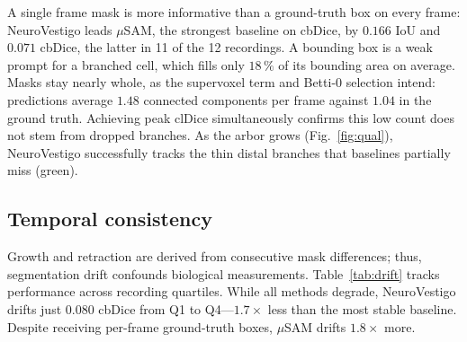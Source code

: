 \documentclass{article}
\begin{document}
A single frame mask is more informative than a ground-truth box on every frame: NeuroVestigo leads $\mu$SAM, the strongest baseline on cbDice, by $0.166$ IoU and $0.071$ cbDice, the latter in 11 of the 12 recordings. A bounding box is a weak prompt for a branched cell, which fills only $18\,\%$ of its bounding area on average. Masks stay nearly whole, as the supervoxel term and Betti-0 selection intend: predictions average $1.48$ connected components per frame against $1.04$ in the ground truth. Achieving peak clDice simultaneously confirms this low count does not stem from dropped branches. As the arbor grows (Fig.~\ref{fig:qual}), NeuroVestigo successfully tracks the thin distal branches that baselines partially miss (green).

\subsection{Temporal consistency}
\label{sec:res:temporal}

Growth and retraction are derived from consecutive mask differences; thus, segmentation drift confounds biological measurements. Table~\ref{tab:drift} tracks performance across recording quartiles. While all methods degrade, NeuroVestigo drifts just $0.080$ cbDice from Q1 to Q4---$1.7\times$ less than the most stable baseline. Despite receiving per-frame ground-truth boxes, $\mu$SAM drifts $1.8\times$ more.
\end{document}
